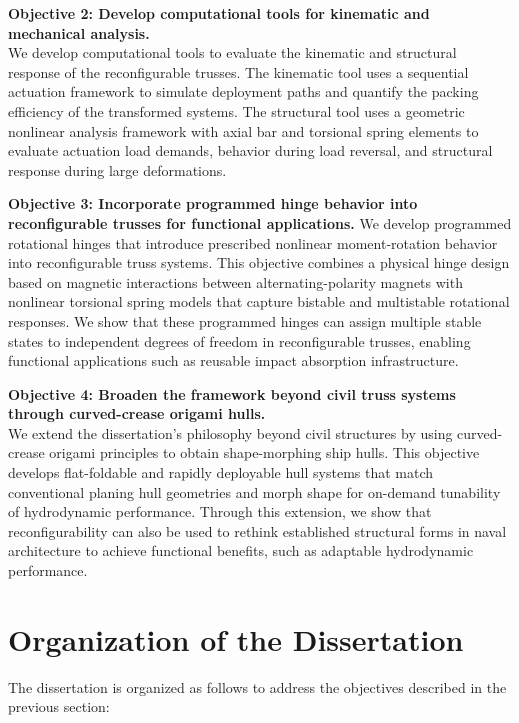 \noindent{}\textbf{Objective 2: Develop computational tools for kinematic and mechanical analysis.}\\
We develop computational tools to evaluate the kinematic and structural response of the reconfigurable trusses. The kinematic tool uses a sequential actuation framework to simulate deployment paths and quantify the packing efficiency of the transformed systems. The structural tool uses a geometric nonlinear analysis framework with axial bar and torsional spring elements to evaluate actuation load demands, behavior during load reversal, and structural response during large deformations.

\noindent{}\textbf{Objective 3: Incorporate programmed hinge behavior into reconfigurable trusses for functional applications.}
We develop programmed rotational hinges that introduce prescribed nonlinear moment-rotation behavior into reconfigurable truss systems. This objective combines a physical hinge design based on magnetic interactions between alternating-polarity magnets with nonlinear torsional spring models that capture bistable and multistable rotational responses. We show that these programmed hinges can assign multiple stable states to independent degrees of freedom in reconfigurable trusses, enabling functional applications such as reusable impact absorption infrastructure.

\noindent{}\textbf{Objective 4: Broaden the framework beyond civil truss systems through curved-crease origami hulls.}\\
We extend the dissertation's philosophy beyond civil structures by using curved-crease origami principles to obtain shape-morphing ship hulls. This objective develops flat-foldable and rapidly deployable hull systems that match conventional planing hull geometries and morph shape for on-demand tunability of hydrodynamic performance. Through this extension, we show that reconfigurability can also be used to rethink established structural forms in naval architecture to achieve functional benefits, such as adaptable hydrodynamic performance.

\section{Organization of the Dissertation}\label{01-sec-organization}
The dissertation is organized as follows to address the objectives described in the previous section:

